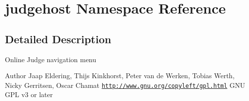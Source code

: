 \hypertarget{namespacejudgehost}{\section{judgehost Namespace Reference}
\label{namespacejudgehost}
}


\subsection{Detailed Description}
Online Judge navigation menu

\begin{DoxyAuthor}{Author}
Jaap Eldering, Thijs Kinkhorst, Peter van de Werken, Tobias Werth, Nicky Gerritsen, Oscar Chamat  \href{http://www.gnu.org/copyleft/gpl.html}{\tt http\-://www.\-gnu.\-org/copyleft/gpl.\-html} G\-N\-U G\-P\-L v3 or later 
\end{DoxyAuthor}
